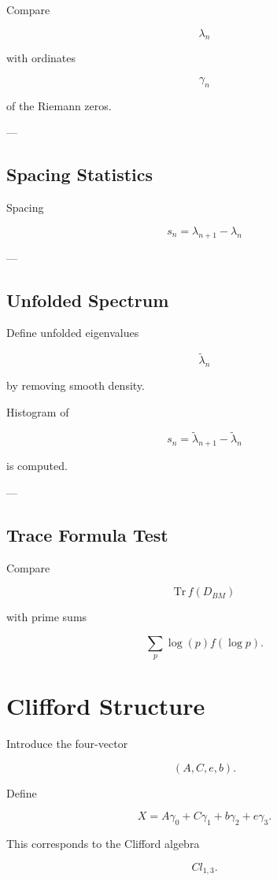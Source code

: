 \documentclass[11pt,a4paper]{article}
\begin{document}
	Compare
	
	\[
	\lambda_n
	\]
	
	with ordinates
	
	\[
	\gamma_n
	\]
	
	of the Riemann zeros.
	
	---
	
	\subsection{Spacing Statistics}
	
	Spacing
	
	\[
	s_n=\lambda_{n+1}-\lambda_n
	\]
	
	
	---
	
	\subsection{Unfolded Spectrum}
	
	Define unfolded eigenvalues
	
	\[
	\tilde{\lambda}_n
	\]
	
	by removing smooth density.
	
	Histogram of
	
	\[
	s_n=\tilde{\lambda}_{n+1}-\tilde{\lambda}_n
	\]
	
	is computed.
	
	---
	
	\subsection{Trace Formula Test}
	
	Compare
	
	\[
	\mathrm{Tr}\,f(D_{BM})
	\]
	
	with prime sums
	
	\[
	\sum_p \log(p)f(\log p).
	\]
	
	
	\section{Clifford Structure}
	
	Introduce the four-vector
	
	\[
	(A,C,e,b).
	\]
	
	Define
	
	\[
	X=A\gamma_0+C\gamma_1+b\gamma_2+e\gamma_3.
	\]
	
	This corresponds to the Clifford algebra
	
	\[
	Cl_{1,3}.
	\]
	
\end{document}
